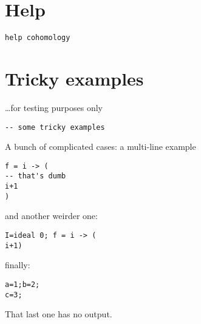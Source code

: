 \documentclass[12pt,a4paper]{amsart}
\begin{document}
\section{Help}
\begin{lstlisting}[language=Macaulay2]
help cohomology
\end{lstlisting}

\section{Tricky examples}
\dots for testing purposes only
\begin{lstlisting}[language=Macaulay2]
-- some tricky examples
\end{lstlisting}
A bunch of complicated cases: a multi-line example
\begin{lstlisting}[language=Macaulay2]
f = i -> (
-- that's dumb
i+1
)
\end{lstlisting}
and another weirder one:
\begin{lstlisting}[language=Macaulay2]
I=ideal 0; f = i -> (
i+1)
\end{lstlisting}
finally:
\begin{lstlisting}[language=Macaulay2]
a=1;b=2;
c=3;
\end{lstlisting}
That last one has no output.
\end{document}
